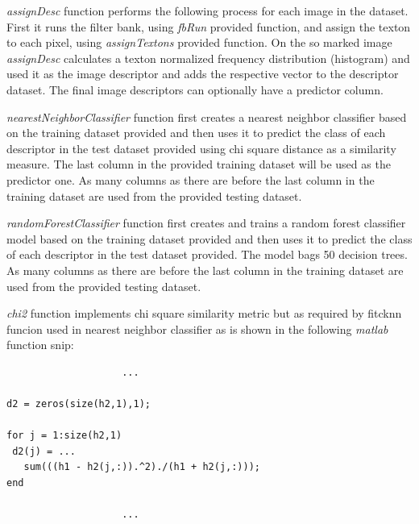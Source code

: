 \documentclass[10pt,twocolumn,letterpaper]{article}
\begin{document}
\textit{assignDesc} function performs the following process for each image in the dataset. First it runs the filter bank, using \textit{fbRun} provided function, and assign the texton to each pixel, using \textit{assignTextons} provided function. On the so marked image \textit{assignDesc} calculates a texton normalized frequency distribution (histogram) and used it as the image descriptor  and adds the respective vector to the descriptor dataset. The final image descriptors can optionally have a predictor column.

\textit{nearestNeighborClassifier} function first creates a nearest neighbor classifier based on the training dataset provided and then uses it to predict the class of each descriptor in the test dataset provided using chi square distance as a similarity measure. The last column in the provided training dataset will be used as the predictor one. As many columns as there are before the last column in the training dataset are used from the provided testing dataset.

\textit{randomForestClassifier} function first creates and trains a random forest classifier model based on the training dataset provided and then uses it to predict the class of each descriptor in the test dataset provided. The model bags 50 decision trees. As many columns as there are before the last column in the training dataset are used from the provided testing dataset.

\textit{chi2} function implements chi square similarity metric but as required by fitcknn funcion used in nearest neighbor classifier as is shown in the following \textit{matlab} function snip:

\begin{verbatim}
                 	...
                	
d2 = zeros(size(h2,1),1);
    
for j = 1:size(h2,1)
 d2(j) = ...
   sum(((h1 - h2(j,:)).^2)./(h1 + h2(j,:)));
end
    
                    ...
\end{verbatim}
\end{document}
